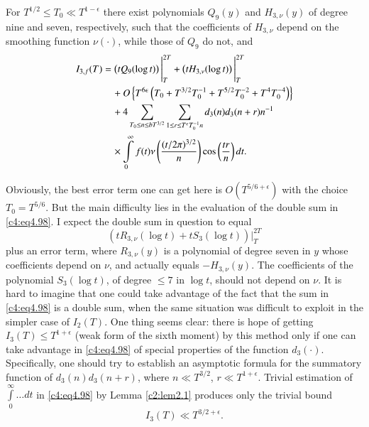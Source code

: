 \begin{thm}\label{c4:thm4.5}
  For $T^{1/2} \leq T_0 \ll T^{1-\epsilon}$ there exist polynomials
  $Q_9 (y)$ and $H_{3, \nu}(y)$ of degree nine and seven,
  respectively, such that the coefficients of $H_{3, \nu}$ depend on
  the smoothing function $\nu (\cdot)$, while those of $Q_9$ do not,
  and
  \begin{align}
     I_{3,f} (T)&= \left(t Q_9 (\log t)\right) \Bigg|_T^{2T} +
     \left(tH_{3, \nu} 
    (\log t)\right) \Bigg|_T^{2T}\notag\\
 &\quad + O \left\{ T^{6\epsilon}  \left(T_0 + T^{3/2} T_0^{-1} +
    T^{5/2}T_0^{-2} + T^4 T_0^{-4}\right) \right\}\notag\\  
 &\quad +4 \sum_{T_0 \leq n \leq b T^{3/2}}  \sum_{1 \leq r \leq T^\epsilon
      T_0^{-1} n} d_3 (n) d_3 (n+r) n^{-1}\notag\\ 
 &\quad\times\int\limits_0^\infty f(t)
    \nu \left(\frac{(t/2\pi)^{3/2}}{n} \right) \cos \left(\frac{tr}{n}
    \right)dt. \label{c4:eq4.98}
  \end{align}
\end{thm}

Obviously, the best error term one can get here is $O(T^{5/6+
  \epsilon})$ with the choice $T_0 = T^{5/6}$. But the main difficulty
lies in the evaluation of the double sum in \eqref{c4:eq4.98}. I
expect the double sum in question to equal
$$
\left(t R_{3, \nu} (\log t) + t S_3 (\log t)\right)\Bigg|_T^{2T}
$$
plus an error term, where $R_{3, \nu}(y)$ is a polynomial of degree
seven in $y$ whose coefficients depend on $\nu$, and actually equals
$- H_{3, \nu} (y)$. The coefficients of the polynomial $S_3 (\log t)$,
of degree $\leq 7$ in $\log t$, should not depend on $\nu$. It is hard
to imagine that one could take advantage of the fact that the sum in
\eqref{c4:eq4.98} is a double sum, when the same situation was
difficult to exploit in the simpler case of $I_2 (T)$. One thing seems
clear: there is hope of getting $I_3 (T) \leq T^{1+ \epsilon}$ (weak
form of the sixth moment) by this method only if one can take
advantage in \eqref{c4:eq4.98} of special properties of the function
$d_3 (\cdot)$. Specifically, one should try to establish\pageoriginale
an asymptotic formula for the summatory function of $d_3 (n) d_3
(n+r)$, where $n \ll T^{3/2}$, $r \ll T^{1+\epsilon}$. Trivial
estimation of $\int\limits_0^\infty \ldots dt$ in \eqref{c4:eq4.98}
by Lemma \ref{c2:lem2.1} produces only the trivial bound
$$
I_3 (T) \ll T^{3/2+ \epsilon}.
$$

